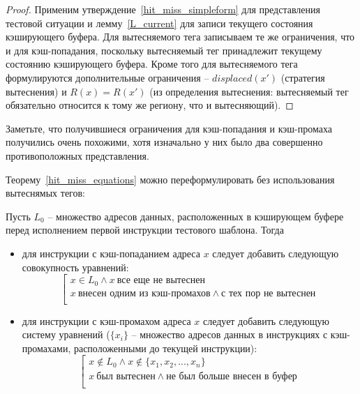 \begin{theorem}\label{hit_miss_equations} \HitMissEquations
\end{theorem}
\begin{proof}
Применим утверждение~\ref{hit_miss_simpleform} для представления
тестовой ситуации и лемму~\ref{L_current} для записи текущего
состояния кэширующего буфера. Для вытесняемого тега записываем те же
ограничения, что и для кэш-попадания, поскольку вытесняемый тег
принадлежит текущему состоянию кэширующего буфера. Кроме того для
вытесняемого тега формулируются дополнительные ограничения --
$displaced(x')$ (стратегия вытеснения) и $R(x) = R(x')$ (из
определения вытеснения: вытесняемый тег обязательно относится к тому
же региону, что и вытесняющий).
\end{proof}

Заметьте, что получившиеся ограничения для кэш-попадания и
кэш-промаха получились очень похожими, хотя изначально у них было
два совершенно противоположных представления.

Теорему~\ref{hit_miss_equations} можно переформулировать без
использования вытеснямых тегов:

\begin{utv}\label{hit_miss_human} Пусть $L_0$ -- множество
адресов данных, расположенных в кэширующем буфере перед исполнением
первой инструкции тестового шаблона. Тогда
\begin{itemize}
\item для инструкции с кэш-попаданием адреса $x$ следует добавить
следующую совокупность уравнений:
$$
\left[
   \begin{array}{l}
    x \in L_0 \wedge x~\mbox{все еще не вытеснен} \\
    x~\mbox{внесен одним из кэш-промахов} \wedge \mbox{с тех пор не вытеснен} \\
   \end{array}
  \right.
$$

\item для инструкции с кэш-промахом адреса $x$ следует добавить следующую систему
уравнений ($\{x_i\}$ -- множество адресов данных в инструкциях с
кэш-промахами, расположенными до текущей инструкции):
$$
\left[
   \begin{array}{l}
    x \notin L_0 \wedge x \notin \{x_1, x_2, ..., x_n\} \\
    x~\mbox{был вытеснен} \wedge \mbox{не был больше внесен в буфер}\\
  \end{array}
\right.
$$

\end{itemize}
\end{utv}

